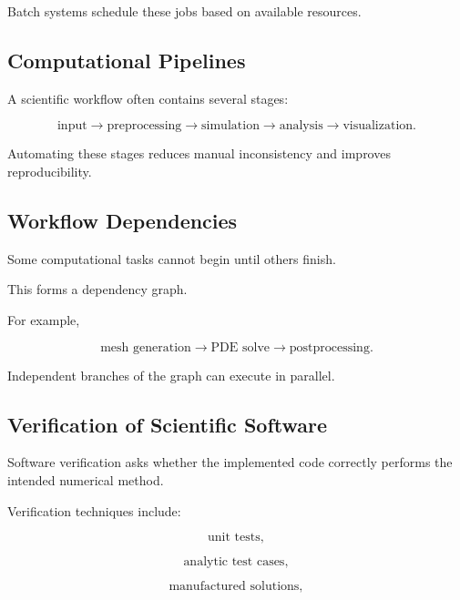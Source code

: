Batch systems schedule these jobs based on available resources.

\subsection{Computational Pipelines}
\label{subsec:computational-pipelines}

A scientific workflow often contains several stages:

\[
\boxed{
\text{input}
\rightarrow
\text{preprocessing}
\rightarrow
\text{simulation}
\rightarrow
\text{analysis}
\rightarrow
\text{visualization}.
}
\]

Automating these stages reduces manual inconsistency and improves
reproducibility.

\subsection{Workflow Dependencies}
\label{subsec:workflow-dependencies}

Some computational tasks cannot begin until others finish.

This forms a dependency graph.

For example,

\[
\boxed{
\text{mesh generation}
\rightarrow
\text{PDE solve}
\rightarrow
\text{postprocessing}.
}
\]

Independent branches of the graph can execute in parallel.

\subsection{Verification of Scientific Software}
\label{subsec:scientific-software-verification}

Software verification asks whether the implemented code correctly performs
the intended numerical method.

Verification techniques include:

\[
\boxed{
\text{unit tests},
}
\]

\[
\boxed{
\text{analytic test cases},
}
\]

\[
\boxed{
\text{manufactured solutions},
}
\]

